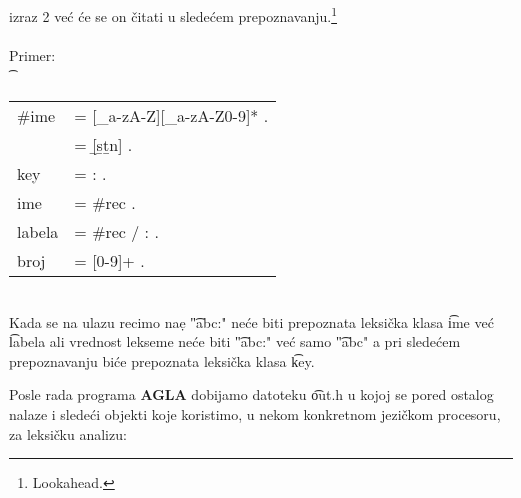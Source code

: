 \begin{itemize}
{          izraz 2 ve\'c \'ce se on \v citati u slede\'cem prepoznavanju.\footnote{Lookahead.}\\
          \\
          Primer:\\
          \t
          {
            \begin{tabular}{ll}
              \#ime &= [\_a-zA-Z][\_a-zA-Z0-9]* . \\
                    &= [{\b}s{\b}t{\b}n] .\\
              key   &= : .\\
              ime   &= \#rec . \\
              labela&= \#rec / : .\\
              broj  &= [0-9]+ .\\
            \end{tabular}
          }\\
          Kada se na ulazu recimo na\d e \t{"abc:"} ne\'ce biti prepoznata
          leksi\v cka klasa \t{ime} ve\'c \t{labela} ali vrednost lekseme
          ne\'ce biti \t{"abc:"} ve\'c samo \t{"abc"} a pri slede\'cem
          prepoznavanju bi\'ce prepoznata leksi\v cka klasa \t{key}.
        }
      \end{itemize}
%
%
      Posle rada programa {\bf AGLA} dobijamo datoteku \t{out.h} u kojoj
      se pored ostalog nalaze i slede\'ci objekti koje koristimo, u nekom
      konkretnom jezi\v ckom procesoru, za leksi\v cku analizu:
